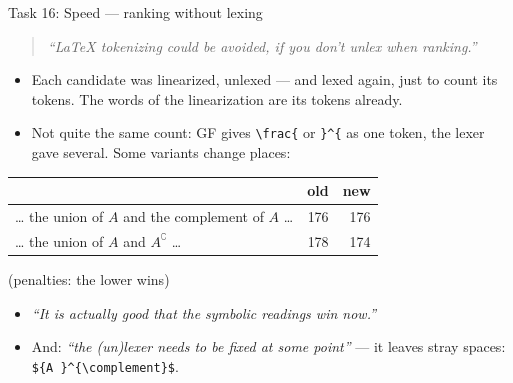 \documentclass[10pt,aspectratio=169]{beamer}
\newcommand{\ok}[1]{\textcolor{good}{#1}}
\newcommand{\prompt}[1]{\begin{quote}\small\itshape ``#1''\end{quote}}
\begin{document}
\begin{frame}{Task 16: Speed --- ranking without lexing}
  \prompt{LaTeX tokenizing could be avoided, if you don't unlex when ranking.}
  \begin{itemize}\small
    \item Each candidate was linearized, unlexed --- and lexed again, just to count
          its tokens. The words of the linearization are its tokens already.
    \item Not quite the same count: GF gives \texttt{\textbackslash frac\{} or
          \texttt{\}\^{}\{} as one token, the lexer gave several. Some variants
          change places:
  \end{itemize}
  \begin{center}\footnotesize
  \begin{tabular}{lrr}
    \toprule
    & \textbf{old} & \textbf{new} \\
    \midrule
    \dots{} the union of $A$ and the complement of $A$ \dots & 176 & 176 \\
    \dots{} the union of $A$ and ${A}^{\complement}$ \dots & 178 & \ok{174} \\
    \bottomrule
  \end{tabular}
  \quad (penalties: the lower wins)
  \end{center}
  \begin{itemize}\small
    \item \emph{``It is actually good that the symbolic readings win now.''}
    \item And: \emph{``the (un)lexer needs to be fixed at some point''} ---
          it leaves stray spaces: \texttt{\$\{A \}\^{}\{\textbackslash complement\}\$}.
  \end{itemize}
\end{frame}
\end{document}

